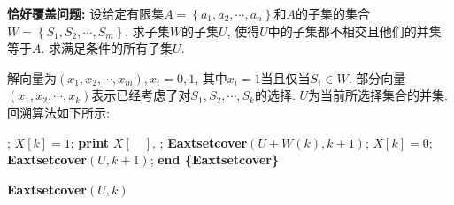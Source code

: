 \documentclass{article}
\begin{document}
\begin{homeworkProblem}
	\textbf{恰好覆盖问题:} 设给定有限集$A=\left\{ a_1,a_2,\cdots,a_n \right\}$和$A$的子集的集合$W=\left\{ S_1,S_2,\cdots,S_m \right\}$. 求子集$W$的子集$U$, 使得$U$中的子集都不相交且他们的并集等于$A$. 求满足条件的所有子集$U$.

	\solution 解向量为$\left( x_1,x_2,\cdots ,x_m \right) ,x_i=0,1$, 其中$x_i=1$当且仅当$S_i\in W$. 部分向量$(x_1,x_2,\cdots,x_k)$表示已经考虑了对$S_1,S_2,\cdots,S_k$的选择. $U$为当前所选择集合的并集.
	回溯算法如下所示:
	\begin{algorithm}[H]
		\begin{algorithmic}[1]
			\State \Return;
		\EndIf
			\State $X[k]=1$;
				\State \textbf{print} $X[\quad]$, \Return;
			\Else
				\State \textbf{Eaxtsetcover}$(U+W(k),k+1)$;
			\EndIf
		\EndIf
		\State $X[k]=0$;
		\State \textbf{Eaxtsetcover}$(U,k+1)$;
		\State \textbf{end \{Eaxtsetcover\}}
		\end{algorithmic}
		\caption{\textbf{Eaxtsetcover}$(U,k)$}
		\label{alg:Eaxtsetcover}
	\end{algorithm}
\end{homeworkProblem}
\end{document}
